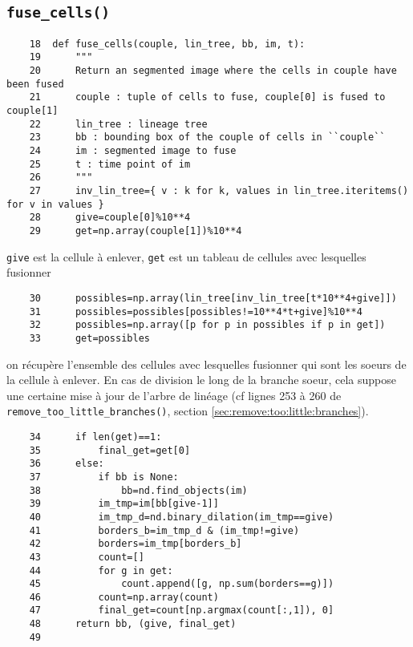 \documentclass{article}
\def \mycolor {red}
\begin{document}
\subsection{\texttt{fuse\_cells()}}
\label{sec:fuse:cells}
\begin{verbatim}
    18	def fuse_cells(couple, lin_tree, bb, im, t):
    19	    """
    20	    Return an segmented image where the cells in couple have been fused
    21	    couple : tuple of cells to fuse, couple[0] is fused to couple[1]
    22	    lin_tree : lineage tree
    23	    bb : bounding box of the couple of cells in ``couple``
    24	    im : segmented image to fuse
    25	    t : time point of im
    26	    """
    27	    inv_lin_tree={ v : k for k, values in lin_tree.iteritems() for v in values }
    28	    give=couple[0]%10**4
    29	    get=np.array(couple[1])%10**4
\end{verbatim} 
\color{\mycolor}
\verb|give| est la cellule \`a enlever, \verb|get| est un tableau de cellules avec lesquelles fusionner
\color{black}
\begin{verbatim}
    30	    possibles=np.array(lin_tree[inv_lin_tree[t*10**4+give]])
    31	    possibles=possibles[possibles!=10**4*t+give]%10**4
    32	    possibles=np.array([p for p in possibles if p in get])
    33	    get=possibles
\end{verbatim} 
\color{\mycolor}
on r\'ecup\`ere l'ensemble des cellules avec lesquelles fusionner qui sont les soeurs de la cellule \`a enlever. En cas de division le long de la branche soeur, cela suppose une certaine mise \`a jour de l'arbre de lin\'eage (cf lignes 253 \`a 260 de \verb|remove_too_little_branches()|, section \ref{sec:remove:too:little:branches}).
\color{black}
\begin{verbatim}
    34	    if len(get)==1:
    35	        final_get=get[0]
    36	    else:
    37	        if bb is None:
    38	            bb=nd.find_objects(im)
    39	        im_tmp=im[bb[give-1]]
    40	        im_tmp_d=nd.binary_dilation(im_tmp==give)
    41	        borders_b=im_tmp_d & (im_tmp!=give)
    42	        borders=im_tmp[borders_b]
    43	        count=[]
    44	        for g in get:
    45	            count.append([g, np.sum(borders==g)])
    46	        count=np.array(count)
    47	        final_get=count[np.argmax(count[:,1]), 0]
    48	    return bb, (give, final_get)
    49	    
\end{verbatim}
\end{document}
